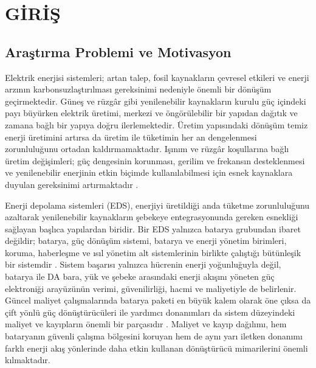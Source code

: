 \chapter{GİRİŞ}
\label{chap:giris}

\section{Araştırma Problemi ve Motivasyon}
\label{sec:giris-problem}

Elektrik enerjisi sistemleri; artan talep, fosil kaynakların çevresel etkileri ve enerji arzının karbonsuzlaştırılması gereksinimi nedeniyle önemli bir dönüşüm geçirmektedir. Güneş ve rüzgâr gibi yenilenebilir kaynakların kurulu güç içindeki payı büyürken elektrik üretimi, merkezi ve öngörülebilir bir yapıdan dağıtık ve zamana bağlı bir yapıya doğru ilerlemektedir. Üretim yapısındaki dönüşüm temiz enerji üretimini artırsa da üretim ile tüketimin her an dengelenmesi zorunluluğunu ortadan kaldırmamaktadır. Işınım ve rüzgâr koşullarına bağlı üretim değişimleri; güç dengesinin korunması, gerilim ve frekansın desteklenmesi ve yenilenebilir enerjinin etkin biçimde kullanılabilmesi için esnek kaynaklara duyulan gereksinimi artırmaktadır \citep{Chen2009,Aneke2016,IEAPVPS2024}.

Enerji depolama sistemleri (EDS), enerjiyi üretildiği anda tüketme zorunluluğunu azaltarak yenilenebilir kaynakların şebekeye entegrasyonunda gereken esnekliği sağlayan başlıca yapılardan biridir. Bir EDS yalnızca batarya grubundan ibaret değildir; batarya, güç dönüşüm sistemi, batarya ve enerji yönetim birimleri, koruma, haberleşme ve ısıl yönetim alt sistemlerinin birlikte çalıştığı bütünleşik bir sistemdir \citep{Hannan2017,Plett2015}. Sistem başarısı yalnızca hücrenin enerji yoğunluğuyla değil, batarya ile DA bara, yük ve şebeke arasındaki enerji akışını yöneten güç elektroniği arayüzünün verimi, güvenilirliği, hacmi ve maliyetiyle de belirlenir. Güncel maliyet çalışmalarında batarya paketi en büyük kalem olarak öne çıksa da çift yönlü güç dönüştürücüleri ile yardımcı donanımları da sistem düzeyindeki maliyet ve kayıpların önemli bir parçasıdır \citep{Ramasamy2023,Lazard2024}. Maliyet ve kayıp dağılımı, hem bataryanın güvenli çalışma bölgesini koruyan hem de aynı yarı iletken donanımı farklı enerji akış yönlerinde daha etkin kullanan dönüştürücü mimarilerini önemli kılmaktadır.

